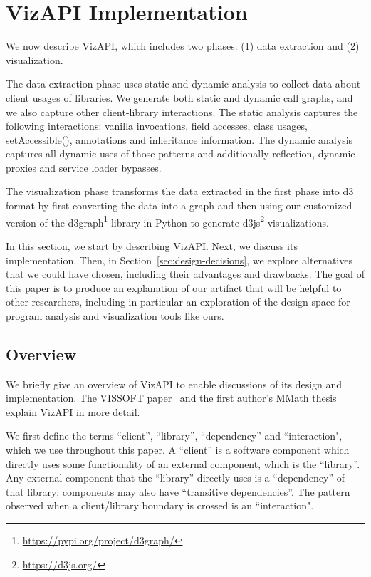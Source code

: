 \section{VizAPI Implementation}
\label{sec:implementation}
We now describe VizAPI, which includes two phases: (1) data extraction and (2) visualization. 

The data extraction phase uses static and dynamic
analysis to collect data about client usages of libraries. We generate both static and
dynamic call graphs, and we also capture other client-library interactions. The static analysis captures the
following interactions: vanilla invocations, field accesses, class usages,
setAccessible(), annotations and inheritance information. The dynamic
analysis captures all dynamic uses of those patterns and additionally
reflection, dynamic proxies and service loader bypasses.

The visualization phase transforms the data extracted in the first phase into d3 format by first converting the data into a graph and then using our customized version
of the d3graph\footnote{\url{https://pypi.org/project/d3graph/}} library in Python to generate d3js\footnote{\url{https://d3js.org/}} visualizations. 

In this section, we start by describing VizAPI. Next, we discuss its implementation. Then, in Section~\ref{sec:design-decisions}, we explore
alternatives that we could have chosen, including their advantages and
drawbacks.  The goal of this paper is to produce an explanation of our
artifact that will be helpful to other researchers, including in
particular an exploration of the design space for program analysis and visualization tools like ours.

\subsection{Overview}
We briefly give an overview of VizAPI to enable discussions of its design and implementation.
The VISSOFT paper~\cite{venkatanarayanan22:_vizap}
and the first author's MMath thesis~\cite{venkatanarayanan22:_study_lever_api_usage_patter} explain VizAPI in more detail.

We first define the terms ``client'', ``library'', ``dependency'' and ``interaction", which we use throughout this paper. A ``client'' is a software component which directly uses some functionality of an external component, which is the ``library''. Any external component that the ``library'' directly uses is a ``dependency'' of that library; components may also have ``transitive dependencies''. The pattern observed when a client/library boundary is crossed is an ``interaction". 

